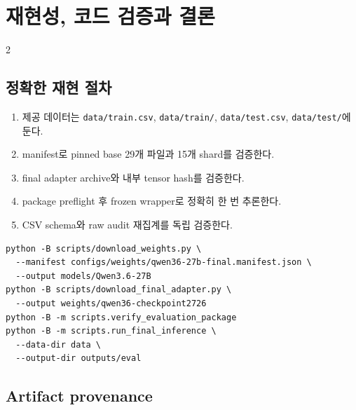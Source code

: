 \documentclass[9pt,a4paper]{extarticle}
\newcommand{\code}[1]{\texttt{\footnotesize #1}}
\begin{document}
\section{재현성, 코드 검증과 결론}
\begin{multicols}{2}

\subsection{정확한 재현 절차}

\begin{enumerate}
\item 제공 데이터는 \code{data/train.csv}, \code{data/train/},
\code{data/test.csv}, \code{data/test/}에 둔다.
\item manifest로 pinned base 29개 파일과 15개 shard를 검증한다.
\item final adapter archive와 내부 tensor hash를 검증한다.
\item package preflight 후 frozen wrapper로 정확히 한 번 추론한다.
\item CSV schema와 raw audit 재집계를 독립 검증한다.
\end{enumerate}

{\scriptsize
\begin{verbatim}
python -B scripts/download_weights.py \
  --manifest configs/weights/qwen36-27b-final.manifest.json \
  --output models/Qwen3.6-27B
python -B scripts/download_final_adapter.py \
  --output weights/qwen36-checkpoint2726
python -B -m scripts.verify_evaluation_package
python -B -m scripts.run_final_inference \
  --data-dir data \
  --output-dir outputs/eval
\end{verbatim}
}

\subsection{Artifact provenance}
\begin{center}
\end{center}


\end{multicols}
\end{document}
